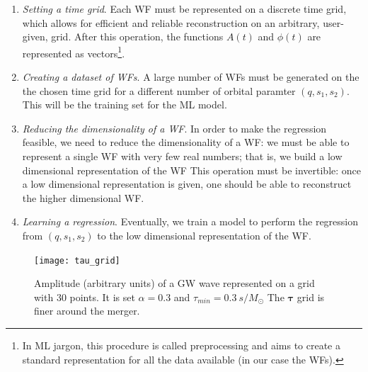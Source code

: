 \begin{enumerate}[label=(\Alph*)]
	\item \textit{Setting a time grid}. Each WF must be represented on a discrete time grid, which allows for efficient and reliable reconstruction on an arbitrary, user-given, grid. After this operation, the functions $A(t)$ and $\phi(t)$ are represented as vectors\footnote{
In ML jargon, this procedure is called preprocessing and aims to create a standard representation for all the data available (in our case the WFs).
}.
	\item \textit{Creating a dataset of WFs}. A large number of WFs must be generated on the the chosen time grid for a different number of orbital paramter $(q,s_1,s_2)$. This will be the training set for the ML model.
	\item \textit{Reducing the dimensionality of a WF}. In order to make the regression feasible, we need to reduce the dimensionality of a WF: we must be able to represent a single WF with very few real numbers; that is, we build a low dimensional representation of the WF This operation must be invertible: once a low dimensional representation is given, one should be able to reconstruct the higher dimensional WF.
	\item \textit{Learning a regression}. Eventually, we train a model to perform the regression from $(q, s_1, s_2)$ to the low dimensional representation of the WF.
\end{enumerate}


\begin{figure}[!t]
	\centering
	\texttt{[image: tau\_grid]}
	\caption{Amplitude (arbitrary units) of a GW wave represented on a grid with 30 points.
It is set $\alpha = 0.3$ and $\tau_{min} = \SI{0.3}{s/M_\odot}$
The $\boldsymbol{\tau}$ grid is finer around the merger.
}
	\label{fig:tau_grid}
\end{figure}
%
